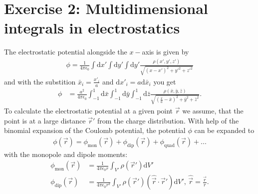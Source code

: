 \section{Exercise 2: Multidimensional integrals in electrostatics}
The electrostatic potential alongside the $x-$axis is given by
\begin{align}
    \phi = \frac{1}{4 \pi \epsilon_0} \int \text{d}x' \int \text{d}y' \int \text{d}y' \frac{\rho(x', y', z')}{\sqrt{(x - x')^2 + y'^2 + z'^2}}
\end{align}
and with the substition $\bar{x}_i = \frac{x'_i}{a}$ and $\text{d}x'_i=a\text{d}\bar{x}_i$ you get 
\begin{align}
    \phi &= \frac{a^2}{4 \pi \epsilon_0} \int_{-1}^1 \text{d}\bar{x} \int_{-1}^1 \text{d}\bar{y} \int_{-1}^1 \text{d}\bar{z} \frac{\rho(\bar{x}, \bar{y}, \bar{z})}{\sqrt{(\frac{x}{a} - \bar{x})^2 + \bar{y}^2 + \bar{z}^2}}.
\end{align}
To calculate the electrostatic potential at a given point $\vec{r}$ we assume, that the point is at a large distance $\vec{r}'$ from the charge distribution. With help of the binomial expansion of the Coulomb potential, the potential $\phi$ can be expanded to
\begin{align}
    \phi(\vec{r}) = \phi_{\text{mon}}(\vec{r}) + \phi_{\text{dip}}(\vec{r}) +\phi_{\text{quad}}(\vec{r}) +...
\end{align}
with the monopole and dipole moments:
\begin{align}
    \phi_{\text{mon}}(\vec{r}) &= \frac{1}{4\pi \epsilon_0 r} \int_{V'} \rho(\vec{r}') \text{d}V' \\
    \phi_{\text{dip}}(\vec{r}) &= \frac{1}{4\pi \epsilon_0 r^2} \int_{V'} \rho(\vec{r}') ( \hat{\vec{r}} \cdot \vec{r}' ) \text{d}V', \, \hat{\vec{r}} = \frac{\vec{r}}{r}.
\end{align}

